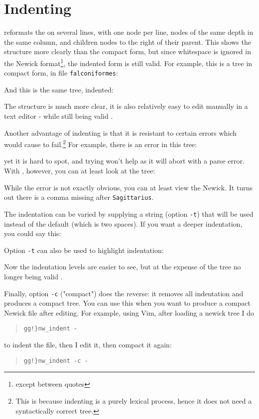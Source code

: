 
\section{Indenting}
\label{sct_indent}

\nwindent{} reformats the \nw{} on several lines, with one node per line,
nodes of the same depth in the same column, and children nodes to the right of
their parent. This shows the structure more
clearly than the compact form, but since whitespace is ignored in the Newick
format\footnote{except between quotes}, the
indented form is still valid. For example, this is a tree in compact form, in
file \texttt{falconiformes}:

And this is the same tree, indented:


The structure is much more clear, it is also relatively easy to edit manually
in a text editor - while still being valid \nw.

Another advantage of indenting is that it is resistant to certain errors
which would cause \display{} to fail.\footnote{This is
because indenting is a purely lexical process, hence it does not need a
syntactically correct tree.} For example, there is an error in this tree:

yet it is hard to spot, and trying \display{} won't help as it will abort with a
parse error. With \nwindent{}, however, you can at least look at the tree:

While the error is not exactly obvious, you can at least view the Newick. It turns out there is a comma missing after \texttt{Sagittarius}.

The indentation can be varied by supplying a string (option \texttt{-t}) that
will be used instead of the default (which is two spaces). If you want a deeper
indentation, you could say this:


Option \texttt{-t} can also be used to highlight indentation:


Now the indentation levels are easier to see, but at the expense of the tree no
longer being valid \nw.

Finally, option \texttt{-c} ("compact") does the reverse: it removes all
indentation and produces a compact tree. You can use this when you want to
produce a compact Newick file after editing. For example, using Vim, after
loading a newick tree I do 
\begin{quote}
\verb+gg!}nw_indent -+
\end{quote}
to indent the file, then I edit it, then compact it again:
\begin{quote}
\verb+gg!}nw_indent -c -+
\end{quote}

